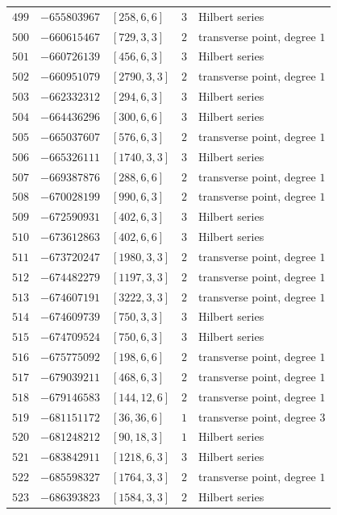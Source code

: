 \documentclass[11pt]{article}
\begin{document}
\begin{center}
\begin{longtable}{r r l c l}
$499$ & $-655803967$ & $[258,6,6]$ & $3$ & Hilbert series\\
$500$ & $-660615467$ & $[729,3,3]$ & $2$ & transverse point, degree $1$\\
$501$ & $-660726139$ & $[456,6,3]$ & $3$ & Hilbert series\\
$502$ & $-660951079$ & $[2790,3,3]$ & $2$ & transverse point, degree $1$\\
$503$ & $-662332312$ & $[294,6,3]$ & $3$ & Hilbert series\\
$504$ & $-664436296$ & $[300,6,6]$ & $3$ & Hilbert series\\
$505$ & $-665037607$ & $[576,6,3]$ & $2$ & transverse point, degree $1$\\
$506$ & $-665326111$ & $[1740,3,3]$ & $3$ & Hilbert series\\
$507$ & $-669387876$ & $[288,6,6]$ & $2$ & transverse point, degree $1$\\
$508$ & $-670028199$ & $[990,6,3]$ & $2$ & transverse point, degree $1$\\
$509$ & $-672590931$ & $[402,6,3]$ & $3$ & Hilbert series\\
$510$ & $-673612863$ & $[402,6,6]$ & $3$ & Hilbert series\\
$511$ & $-673720247$ & $[1980,3,3]$ & $2$ & transverse point, degree $1$\\
$512$ & $-674482279$ & $[1197,3,3]$ & $2$ & transverse point, degree $1$\\
$513$ & $-674607191$ & $[3222,3,3]$ & $2$ & transverse point, degree $1$\\
$514$ & $-674609739$ & $[750,3,3]$ & $3$ & Hilbert series\\
$515$ & $-674709524$ & $[750,6,3]$ & $3$ & Hilbert series\\
$516$ & $-675775092$ & $[198,6,6]$ & $2$ & transverse point, degree $1$\\
$517$ & $-679039211$ & $[468,6,3]$ & $2$ & transverse point, degree $1$\\
$518$ & $-679146583$ & $[144,12,6]$ & $2$ & transverse point, degree $1$\\
$519$ & $-681151172$ & $[36,36,6]$ & $1$ & transverse point, degree $3$\\
$520$ & $-681248212$ & $[90,18,3]$ & $1$ & Hilbert series\\
$521$ & $-683842911$ & $[1218,6,3]$ & $3$ & Hilbert series\\
$522$ & $-685598327$ & $[1764,3,3]$ & $2$ & transverse point, degree $1$\\
$523$ & $-686393823$ & $[1584,3,3]$ & $2$ & Hilbert series\\

\end{longtable}
\end{center}
\end{document}
